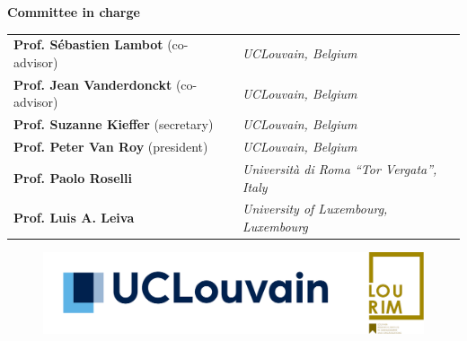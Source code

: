 \documentclass[
  10pt, %
  english, %
  singlespacing, %
]{MastersDoctoralThesis} %
\begin{document}
\begin{titlepage}
  \begin{center}
    \small \textbf{Committee in charge}\\[0.2cm]
    \begin{tabular}{ll}
      \textbf{Prof. Sébastien Lambot} (co-advisor) & \textit{UCLouvain, Belgium} \\
      \textbf{Prof. Jean Vanderdonckt} (co-advisor) & \textit{UCLouvain, Belgium} \\
      \textbf{Prof. Suzanne Kieffer} (secretary) & \textit{UCLouvain, Belgium} \\
      \textbf{Prof. Peter Van Roy} (president) & \textit{UCLouvain, Belgium} \\
      \textbf{Prof. Paolo Roselli} & \textit{Università di Roma ``Tor Vergata'', Italy} \\
      \textbf{Prof. Luis A. Leiva} & \textit{University of Luxembourg, Luxembourg} \\
    \end{tabular}  
  \end{center}
  
  \vfill

  \begin{figure}[H]
    \centering
    \includegraphics[scale = 0.13]{Figures/UCLouvain+LouRIM Fused.png}
  \end{figure}


  \setlength{\parindent}{\oldparindent}%
\end{titlepage}
  
\thispagestyle{empty} 





\tableofcontents %
\end{document}
